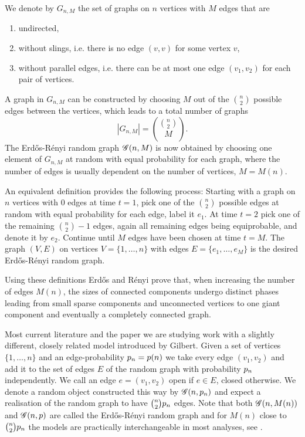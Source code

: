We denote by $G_{n,M}$ the set of graphs on $n$ vertices with $M$ edges that are
\begin{enumerate}
	\item undirected,
	\item without slings, i.e. there is no edge $(v,v)$ for some vertex $v$,
	\item without parallel edges, i.e. there can be at most one edge $(v_1, v_2)$ for each pair of vertices.
\end{enumerate}
A graph in $G_{n,M}$ can be constructed by choosing $M$ out of the $\binom{n}{2}$ possible edges between the vertices,
which leads to a total number of graphs
\begin{equation}
	|G_{n,M}| = \binom{\binom{n}{2}}{M}.
\end{equation}
The Erd\H{o}s-Rényi random graph $\mathscr{G}(n, M)$ is now obtained by choosing one element of $G_{n,M}$ at random
with equal probability for each graph, where the number of edges is usually dependent on the number of vertices, $M = M(n)$.

An equivalent definition provides the following process:
Starting with a graph on $n$ vertices with $0$ edges at time $t=1$, 
pick one of the $\binom{n}{2}$ possible edges at random with equal probability for each edge,
label it $e_1$.
At time $t=2$ pick one of the remaining $\binom{n}{2}-1$ edges, again all remaining edges being equiprobable,
and denote it by $e_2$.
Continue until $M$ edges have been chosen at time $t=M$.
The graph $(V,E)$ on vertices $V = \{1, \dots, n\}$ with edges $E = \{e_1, \dots, e_M\}$ is the desired Erd\H{o}s-Rényi random graph.

Using these definitions Erd\H{o}s and Rényi prove that,
when increasing the number of edges $M(n)$,
the sizes of connected components undergo distinct phases leading from small sparse components and unconnected vertices
to one giant component and eventually a completely connected graph.

Most current literature and the paper we are studying work with a slightly different, closely related model introduced by Gilbert.
Given a set of vertices $\{1, \dots, n\}$ and an edge-probability $p_n = p(n)$
we take every edge $(v_1, v_2)$ and add it to the set of edges $E$ of the random graph with probability $p_n$ independently.
We call an edge $e = (v_1, v_2)$ open if $e \in E$, closed otherwise.
We denote a random object constructed this way by $\mathscr{G}(n, p_n)$\label{I: gnt} and expect a realisation of the random graph to have $\binom{n}{2}p_n$ edges.
Note that both $\mathscr{G}(n, M(n))$ and $\mathscr{G}(n, p)$ are called the Erd\H{o}s-Rényi random graph 
and for $M(n)$ close to $\binom{n}{2}p_n$ the models are practically interchangeable in most analyses, see \cite[p.38]{Bollobas.2001}.

